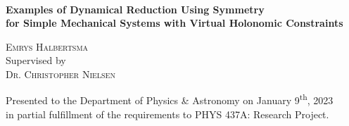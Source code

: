 \begin{titlepage}
\begin{center}
    \vspace*{90mm}
    \hrulefill\\
    \vspace{4mm}
    \Large{ 
           \textbf{
            {Examples of Dynamical Reduction Using Symmetry\\for Simple Mechanical Systems with Virtual Holonomic Constraints}
        }
    }
    \\\vspace{1mm}
    \hrulefill
\end{center}

\vspace*{40mm}

\begin{center}
    {
        \large{
            {\scshape Emrys Halbertsma}
        }
        \vspace{6mm}\\
	\large{
	    Supervised by \\
	    \textsc{Dr. Christopher Nielsen}}
    }
    
    \vspace{6mm}
    \large{
        Presented to the Department of Physics \& Astronomy 
        on January 9\textsuperscript{th}, 2023
        \\in partial fulfillment of the requirements to PHYS 437A: Research Project.
    }
\end{center}

\end{titlepage}


